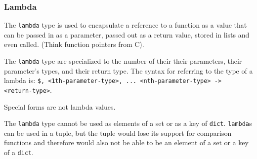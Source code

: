 
\subsubsection{Lambda}
{
	The \texttt{lambda} type is used to encapsulate a reference to
	a function as a value that can be passed in as a parameter, passed out as a
	return value, stored in lists and even called. (Think function pointers from C).
	
	The \texttt{lambda} type are specialized to the number of their their
	parameters, their parameter's types, and their return type.
	The syntax for referring to the type of a lambda
	is: \texttt{\$<0th-parameter-type>, <1th-parameter-type>, ... <nth-parameter-type> -> <return-type>}.
	
	Special forms are not lambda values.
	
	The \texttt{lambda} type cannot be used as elements of a set or
	as a key of \texttt{dict}. \texttt{lambda}s can be used in a 
	tuple, but the tuple
	would lose its support for comparison functions and therefore would
	also not be able to be an element of a set or a key of a \texttt{dict}.
}

